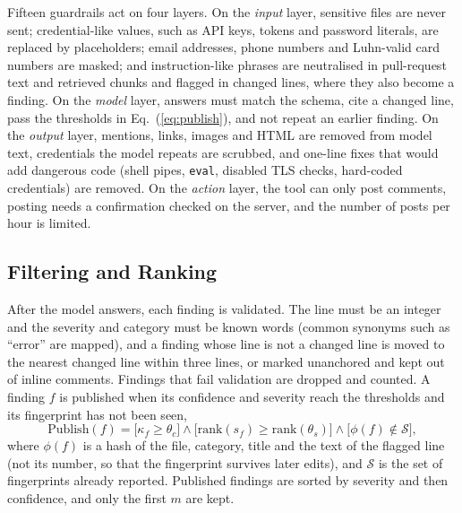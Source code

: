 \documentclass[12pt,onecolumn,draftclsnofoot]{IEEEtran}
\begin{document}
Fifteen guardrails act on four layers. On the \emph{input} layer, sensitive files are never sent; credential-like values, such as API keys, tokens and password literals, are replaced by placeholders; email addresses, phone numbers and Luhn-valid card numbers are masked; and instruction-like phrases are neutralised in pull-request text and retrieved chunks and flagged in changed lines, where they also become a finding. On the \emph{model} layer, answers must match the schema, cite a changed line, pass the thresholds in Eq.~(\ref{eq:publish}), and not repeat an earlier finding. On the \emph{output} layer, mentions, links, images and HTML are removed from model text, credentials the model repeats are scrubbed, and one-line fixes that would add dangerous code (shell pipes, \texttt{eval}, disabled TLS checks, hard-coded credentials) are removed. On the \emph{action} layer, the tool can only post comments, posting needs a confirmation checked on the server, and the number of posts per hour is limited.

\subsection{Filtering and Ranking}
After the model answers, each finding is validated. The line must be an integer and the severity and category must be known words (common synonyms such as ``error'' are mapped), and a finding whose line is not a changed line is moved to the nearest changed line within three lines, or marked unanchored and kept out of inline comments. Findings that fail validation are dropped and counted. A finding $f$ is published when its confidence and severity reach the thresholds and its fingerprint has not been seen,
\begin{equation}
\mathrm{Publish}(f)=\big[\kappa_f\ge\theta_c\big]\wedge\big[\mathrm{rank}(s_f)\ge\mathrm{rank}(\theta_s)\big]\wedge\big[\phi(f)\notin\mathcal{S}\big],\label{eq:publish}
\end{equation}
where $\phi(f)$ is a hash of the file, category, title and the text of the flagged line (not its number, so that the fingerprint survives later edits), and $\mathcal{S}$ is the set of fingerprints already reported. Published findings are sorted by severity and then confidence, and only the first $m$ are kept.
\end{document}
